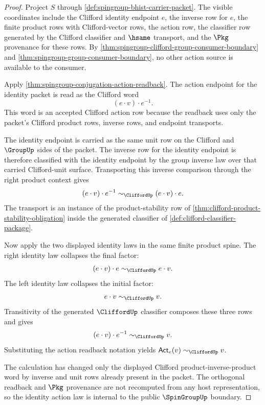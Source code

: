 \begin{proof}
Project $S$ through \autoref{def:spingroup-bhist-carrier-packet}. The visible
coordinates include the Clifford identity endpoint $e$, the inverse row for
$e$, the finite product rows with Clifford-vector rows, the action row, the
classifier row generated by the Clifford classifier and $\hsame$ transport,
and the $\Pkg$ provenance for these rows. By
\autoref{thm:spingroup-clifford-group-consumer-boundary} and
\autoref{thm:spingroup-group-consumer-boundary}, no other action source is
available to the consumer.

Apply \autoref{thm:spingroup-conjugation-action-readback}. The action endpoint
for the identity packet is read as the Clifford word
$$
(e\cdot v)\cdot e^{-1}.
$$
This word is an accepted Clifford action row because the readback uses only the
packet's Clifford product rows, inverse rows, and endpoint transports.

The identity endpoint is carried as the same unit row on the Clifford and
$\GroupUp$ sides of the packet. The inverse row for the identity endpoint is
therefore classified with the identity endpoint by the group inverse law over
that carried Clifford-unit surface. Transporting this inverse comparison
through the right product context gives
$$
(e\cdot v)\cdot e^{-1}\sim_{\CliffordUp}(e\cdot v)\cdot e.
$$
The transport is an instance of the product-stability row of
\autoref{thm:clifford-product-stability-obligation} inside the generated
classifier of \autoref{def:clifford-classifier-package}.

Now apply the two displayed identity laws in the same finite product spine.
The right identity law collapses the final factor:
$$
(e\cdot v)\cdot e\sim_{\CliffordUp}e\cdot v.
$$
The left identity law collapses the initial factor:
$$
e\cdot v\sim_{\CliffordUp}v.
$$
Transitivity of the generated $\CliffordUp$ classifier composes these three
rows and gives
$$
(e\cdot v)\cdot e^{-1}\sim_{\CliffordUp}v.
$$
Substituting the action readback notation yields
$\mathsf{Act}_{e}(v)\sim_{\CliffordUp}v$.

The calculation has changed only the displayed Clifford product-inverse-product
word by inverse and unit rows already present in the packet. The orthogonal
readback and $\Pkg$ provenance are not recomputed from any host representation,
so the identity action law is internal to the public $\SpinGroupUp$ boundary.
\end{proof}

